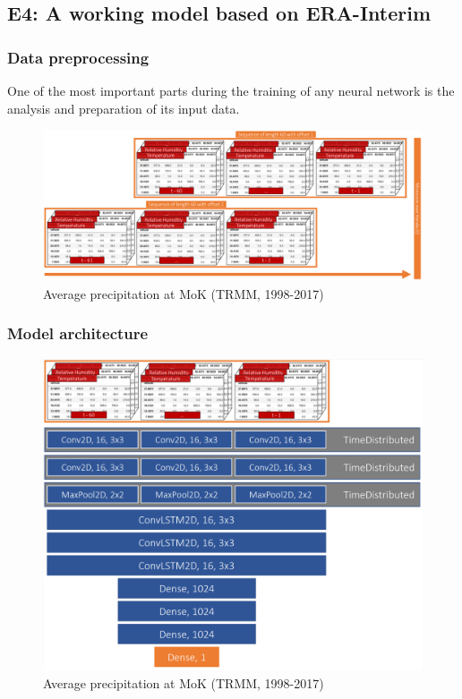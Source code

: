 \subsection{E4: A working model based on ERA-Interim}
\label{sst:final_model}


\subsubsection{Data preprocessing}
One of the most important parts during the training of any neural network is the analysis and preparation of its input data.

\begin{figure}[h]
  \centering
  \includegraphics[width=\linewidth]{./99_appendix/img/E4_preprocessing}
  \caption{Average precipitation at MoK (TRMM, 1998-2017)}
  \label{fig:trmm_prec_onset}
\end{figure}

\subsubsection{Model architecture}

\begin{figure}[h]
  \centering
  \includegraphics[width=\linewidth]{./99_appendix/img/E4_architecture}
  \caption{Average precipitation at MoK (TRMM, 1998-2017)}
  \label{fig:trmm_prec_onset}
\end{figure}

